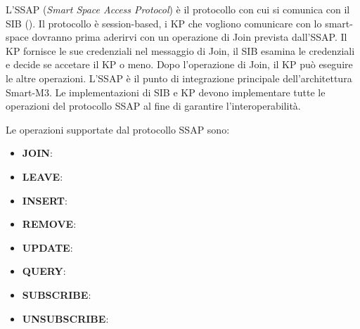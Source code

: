 L'SSAP (\emph{Smart Space Access Protocol}) è il protocollo con cui si comunica con il SIB (\cite{smart2010}). Il protocollo è session-based, i KP che vogliono comunicare con lo smart-space dovranno prima aderirvi con un operazione di Join prevista dall'SSAP. Il KP fornisce le sue credenziali nel messaggio di Join, il SIB esamina le credenziali e decide se accetare il KP o meno. Dopo l'operazione di Join, il KP può eseguire le altre operazioni. 
L'SSAP è il punto di integrazione principale dell'architettura Smart-M3. Le implementazioni di SIB e KP devono implementare tutte le operazioni del protocollo SSAP al fine di garantire l'interoperabilità.

Le operazioni supportate dal protocollo SSAP sono:

\begin{itemize}
	\item \textbf{JOIN}:
	\item \textbf{LEAVE}:
	\item \textbf{INSERT}:
	\item \textbf{REMOVE}:
	\item \textbf{UPDATE}:
	\item \textbf{QUERY}:
	\item \textbf{SUBSCRIBE}:
	\item \textbf{UNSUBSCRIBE}:
\end{itemize}
